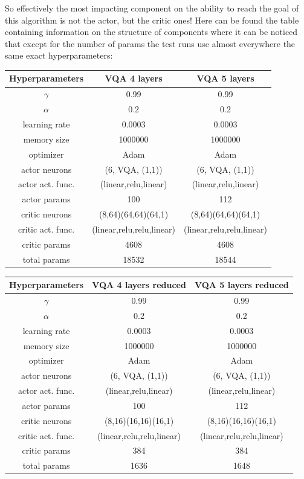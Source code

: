 \vspace{0.5cm}
So effectively the most impacting component on the ability to reach the goal of this algorithm is not the actor, but the critic ones! Here can be found the table containing information on the structure of components where it can be noticed that except for the number of params the test runs use almost everywhere the same exact hyperparameters:
\newline
\vspace{0.2cm}
\newline
\begin{tabular}{|c|c|c|}
	\hline
	Hyperparameters & VQA 4 layers & VQA 5 layers  \\
	\hline
	$\gamma$ & 0.99 & 0.99  \\
	\hline
	$\alpha$ & 0.2 & 0.2  \\
	\hline
	learning rate & 0.0003 & 0.0003  \\
	\hline
	memory size & 1000000 & 1000000   \\
	\hline
	optimizer & Adam & Adam  \\
	\hline
	actor neurons  & (6, VQA, (1,1)) & (6, VQA, (1,1))  \\
	\hline
	actor act. func. & (linear,relu,linear) & (linear,relu,linear) \\
	\hline
	actor params & 100 & 112 \\
	\hline
	critic neurons & (8,64)(64,64)(64,1) & (8,64)(64,64)(64,1)  \\
	\hline
	critic act. func. & (linear,relu,relu,linear) & (linear,relu,relu,linear) \\
	\hline
	critic params & 4608 & 4608 \\
	\hline
	total params & 18532 & 18544 \\
	\hline
\end{tabular}
\newline
\vspace{0.5 cm}
\newline
\begin{tabular}{|c|c|c|}
	\hline
	Hyperparameters & VQA 4 layers reduced & VQA 5 layers reduced  \\
	\hline
	$\gamma$ & 0.99 & 0.99   \\
	\hline
	$\alpha$ & 0.2 & 0.2   \\
	\hline
	learning rate & 0.0003 & 0.0003   \\
	\hline
	memory size & 1000000 & 1000000   \\
	\hline
	optimizer & Adam & Adam  \\
	\hline
	actor neurons  & (6, VQA, (1,1)) & (6, VQA, (1,1))  \\
	\hline
	actor act. func. & (linear,relu,linear) & (linear,relu,linear) \\
	\hline
	actor params & 100 & 112  \\
	\hline
	critic neurons & (8,16)(16,16)(16,1) & (8,16)(16,16)(16,1)  \\
	\hline
	critic act. func. & (linear,relu,relu,linear) & (linear,relu,relu,linear) \\
	\hline
	critic params & 384 & 384\\
	\hline
	total params & 1636 & 1648\\
	\hline
\end{tabular}
